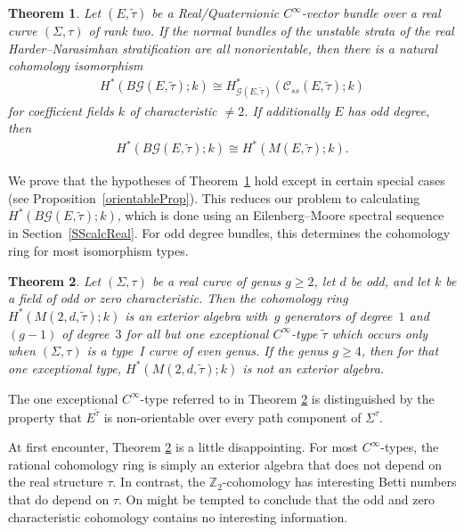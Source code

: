 \documentclass[pdftex]{sigma}
\numberwithin{equation}{section}
\newtheorem{Theorem}{Theorem}[section]
\begin{document}
\begin{Theorem}\label{isomcoh}
	Let $(E,\tilde{\tau})$ be a Real/Quaternionic $C^{\infty}$-vector bundle over a real curve $(\Sigma,\tau)$ of rank two. If the normal bundles of the unstable strata of the real Harder--Narasimhan stratification are all nonorientable, then there is a natural cohomology isomorphism
\begin{gather*}%
 H^*(B{\mathcal G}(E,\tilde{\tau}); k) \cong H_{{\mathcal G}(E,\tilde{\tau})}^*({\mathcal C}_{ss}(E,\tilde{\tau}); k)
\end{gather*}
for coefficient fields $k$ of characteristic $\neq 2$. If additionally $E$ has odd degree, then
\begin{gather*}%
H^*(B{\mathcal G}(E,\tilde{\tau}); k) \cong H^*(M(E,\tilde{\tau}); k).
\end{gather*}
\end{Theorem}

We prove that the hypotheses of Theorem~\ref{isomcoh} hold except in certain special cases (see Proposition~\ref{orientableProp}). This reduces our problem to calculating $H^*(B{\mathcal G}(E,\tilde{\tau}); k)$, which is done using an Eilenberg--Moore spectral sequence in Section~\ref{SScalcReal}. For odd degree bundles, this determines the cohomology ring for most isomorphism types.

\begin{Theorem}\label{bigthm}
Let $(\Sigma,\tau)$ be a real curve of genus $g\geq 2$, let $d$ be odd, and let $k$ be a field of odd or zero characteristic. Then the cohomology ring $ H^*(M(2,d,\tilde{\tau}); k)$ is an exterior algebra with~$g$ generators of degree~$1$ and $(g-1)$ of degree~$3$ for all but one exceptional $C^{\infty}$-type $\tilde{\tau}$ which occurs only when $(\Sigma,\tau)$ is a type~I curve of even genus.
If the genus $g \geq 4$, then for that one exceptional type, $H^*(M(2,d,\tilde{\tau}); k)$ is not an exterior algebra.
\end{Theorem}

The one exceptional $C^{\infty}$-type referred to in Theorem \ref{bigthm} is distinguished by the property that $E^{\tilde{\tau}}$ is non-orientable over every path component of $\Sigma^{\tau}$.

At f\/irst encounter, Theorem \ref{bigthm} is a little disappointing. For most $C^{\infty}$-types, the rational cohomology ring is simply an exterior algebra that does not depend on the real structure $\tau$. In contrast, the ${\mathbb Z}_2$-cohomology has interesting Betti numbers that do depend on $\tau$. On might be tempted to conclude that the odd and zero characteristic cohomology contains no interesting information.
\end{document}

